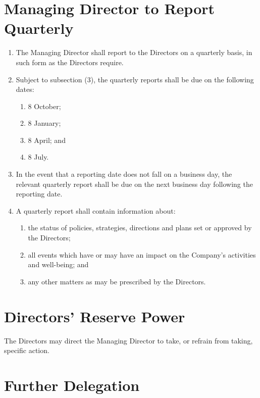 \documentclass[a4paper,10pt]{article}
\begin{document}
\section{Managing Director to Report Quarterly}

\begin{enumerate}
    \item The Managing Director shall report to the Directors on a quarterly basis, in such form as the Directors require.
    \item Subject to subsection (3), the quarterly reports shall be due on the following dates:
    \begin{enumerate}
        \item 8 October;
        \item 8 January;
        \item 8 April; and
        \item 8 July. %
    \end{enumerate}
    \item In the event that a reporting date does not fall on a business day, the relevant quarterly report shall be due on the next business day following the reporting date.
    \item A quarterly report shall contain information about:
    \begin{enumerate}
        \item the status of policies, strategies, directions and plans set or approved by the Directors;
        \item all events which have or may have an impact on the Company's activities and well-being; and
        \item any other matters as may be prescribed by the Directors.
    \end{enumerate}
\end{enumerate}

\section{Directors' Reserve Power}

The Directors may direct the Managing Director to take, or refrain from taking, specific action.

\section{Further Delegation}
\end{document}
